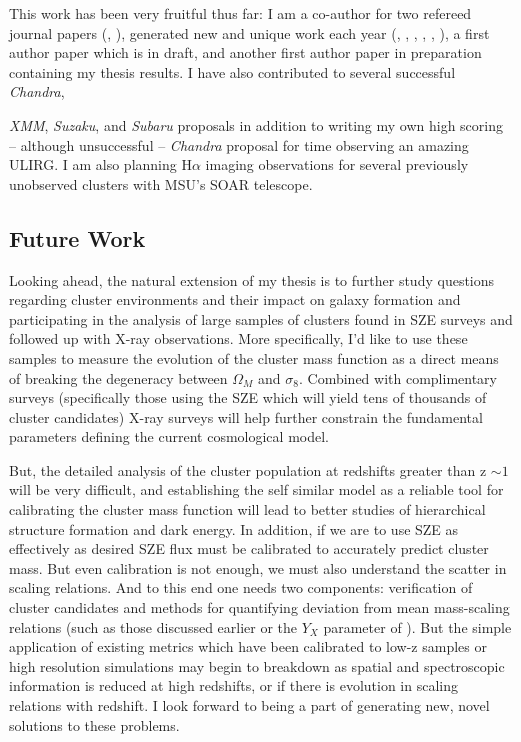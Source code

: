 \documentclass[11pt]{article}
\begin{document}
This work has been very fruitful thus far: I am a co-author for two
refereed journal papers (\cite{2007AJ....134...14D},
\cite{2006ApJ...643..730D}), generated new and unique work each year
(\cite{2008AAS},  \cite{2007Chandrasym}, \cite{2006AAS...209.7711D},
\cite{2005AAS...20713903C}, \cite{2004AAS...20514715C},
\cite{2004AAS...205.6020D}), a first author paper which is in draft,
and another first author paper in preparation containing my thesis
results. I have also contributed to several successful
{\textit{Chandra}}, {\textit{XMM}, {\textit{Suzaku}}, and
{\textit{Subaru}} proposals in addition to writing my own high
scoring -- although unsuccessful -- {\textit{Chandra}} proposal for time
observing an amazing ULIRG. I am also planning H$\alpha$ imaging
observations for several previously unobserved clusters with MSU's
SOAR telescope.

\subsection*{Future Work}

Looking ahead, the natural extension of my thesis is to further study
questions regarding cluster environments and their impact on galaxy
formation and participating in the analysis of large samples of
clusters found in SZE surveys and followed up with X-ray
observations. More specifically, I'd like to use these samples to 
measure the evolution of the cluster mass function as a direct means
of breaking the degeneracy between $\Omega_M$ and $\sigma_8$. Combined
with complimentary surveys (specifically those using the SZE which
will yield tens of thousands of cluster candidates) X-ray surveys will
help further constrain the fundamental parameters defining the current
cosmological model.

But, the detailed analysis of the cluster population at redshifts
greater than z $\sim 1$ will be very difficult, and establishing the
self similar model as a reliable tool for calibrating the cluster mass
function will lead to better studies of hierarchical structure
formation and dark energy. In addition, if we are to use SZE as
effectively as desired SZE flux must be calibrated to accurately predict
cluster mass. But even calibration is not enough, we must also
understand the scatter in scaling relations. And to this end one needs
two components: verification of cluster candidates and methods for
quantifying deviation from mean mass-scaling relations (such as those
discussed earlier or the $Y_X$ parameter of
\cite{2006ApJ...650..128K}). But the simple application of existing
metrics which have been calibrated to low-z samples or high resolution
simulations may begin to breakdown as spatial and spectroscopic
information is reduced at high redshifts, or if there is evolution in
scaling relations with redshift. I look forward to being a part of
generating new, novel solutions to these problems.

}
\end{document}
